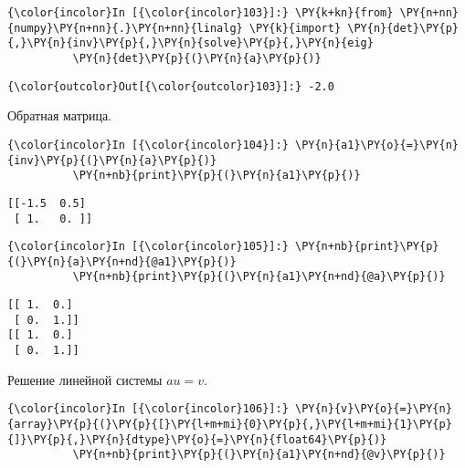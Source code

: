     \begin{Verbatim}[commandchars=\\\{\}]
{\color{incolor}In [{\color{incolor}103}]:} \PY{k+kn}{from} \PY{n+nn}{numpy}\PY{n+nn}{.}\PY{n+nn}{linalg} \PY{k}{import} \PY{n}{det}\PY{p}{,}\PY{n}{inv}\PY{p}{,}\PY{n}{solve}\PY{p}{,}\PY{n}{eig}
          \PY{n}{det}\PY{p}{(}\PY{n}{a}\PY{p}{)}
\end{Verbatim}

            \begin{Verbatim}[commandchars=\\\{\}]
{\color{outcolor}Out[{\color{outcolor}103}]:} -2.0
\end{Verbatim}
        
    Обратная матрица.

    \begin{Verbatim}[commandchars=\\\{\}]
{\color{incolor}In [{\color{incolor}104}]:} \PY{n}{a1}\PY{o}{=}\PY{n}{inv}\PY{p}{(}\PY{n}{a}\PY{p}{)}
          \PY{n+nb}{print}\PY{p}{(}\PY{n}{a1}\PY{p}{)}
\end{Verbatim}

    \begin{Verbatim}[commandchars=\\\{\}]
[[-1.5  0.5]
 [ 1.   0. ]]

    \end{Verbatim}

    \begin{Verbatim}[commandchars=\\\{\}]
{\color{incolor}In [{\color{incolor}105}]:} \PY{n+nb}{print}\PY{p}{(}\PY{n}{a}\PY{n+nd}{@a1}\PY{p}{)}
          \PY{n+nb}{print}\PY{p}{(}\PY{n}{a1}\PY{n+nd}{@a}\PY{p}{)}
\end{Verbatim}

    \begin{Verbatim}[commandchars=\\\{\}]
[[ 1.  0.]
 [ 0.  1.]]
[[ 1.  0.]
 [ 0.  1.]]

    \end{Verbatim}

    Решение линейной системы \(au=v\).

    \begin{Verbatim}[commandchars=\\\{\}]
{\color{incolor}In [{\color{incolor}106}]:} \PY{n}{v}\PY{o}{=}\PY{n}{array}\PY{p}{(}\PY{p}{[}\PY{l+m+mi}{0}\PY{p}{,}\PY{l+m+mi}{1}\PY{p}{]}\PY{p}{,}\PY{n}{dtype}\PY{o}{=}\PY{n}{float64}\PY{p}{)}
          \PY{n+nb}{print}\PY{p}{(}\PY{n}{a1}\PY{n+nd}{@v}\PY{p}{)}
\end{Verbatim}

